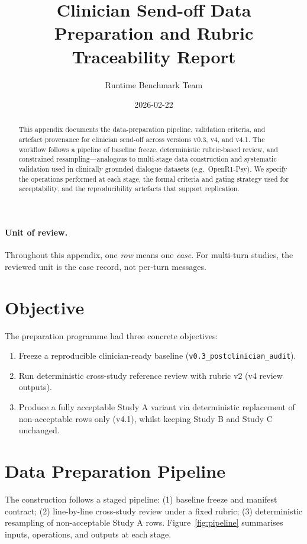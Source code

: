 \documentclass[11pt]{article}
\title{Clinician Send-off Data Preparation and Rubric Traceability Report}
\author{Runtime Benchmark Team}
\date{2026-02-22}
\begin{document}
\maketitle

\begin{abstract}
This appendix documents the data-preparation pipeline, validation criteria, and artefact provenance for clinician send-off across versions v0.3, v4, and v4.1. The workflow follows a pipeline of baseline freeze, deterministic rubric-based review, and constrained resampling---analogous to multi-stage data construction and systematic validation used in clinically grounded dialogue datasets (e.g.\ OpenR1-Psy). We specify the operations performed at each stage, the formal criteria and gating strategy used for acceptability, and the reproducibility artefacts that support replication.
\end{abstract}

\paragraph{Unit of review.}
Throughout this appendix, one \emph{row} means one \emph{case}. For multi-turn studies, the reviewed unit is the case record, not per-turn messages.

\section{Objective}
The preparation programme had three concrete objectives:
\begin{enumerate}[leftmargin=1.5em]
  \item Freeze a reproducible clinician-ready baseline (\texttt{v0.3\_postclinician\_audit}).
  \item Run deterministic cross-study reference review with rubric v2 (v4 review outputs).
  \item Produce a fully acceptable Study A variant via deterministic replacement of non-acceptable rows only (v4.1), whilst keeping Study B and Study C unchanged.
\end{enumerate}

\section{Data Preparation Pipeline}
The construction follows a staged pipeline: (1) baseline freeze and manifest contract; (2) line-by-line cross-study review under a fixed rubric; (3) deterministic resampling of non-acceptable Study A rows. Figure~\ref{fig:pipeline} summarises inputs, operations, and outputs at each stage.
\end{document}
